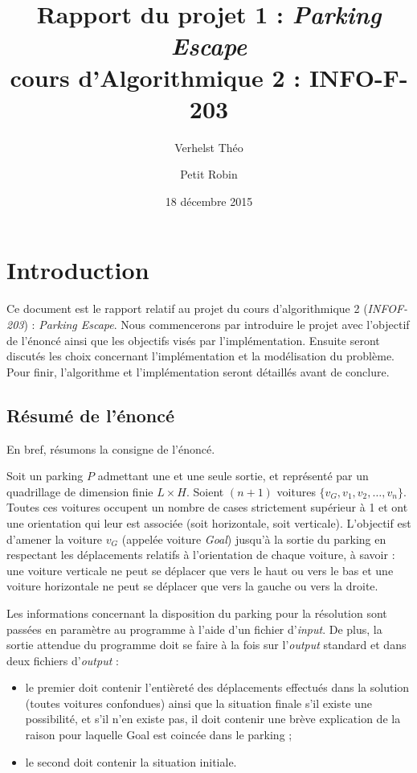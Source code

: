 \documentclass{article}
\title{Rapport du projet 1 : \textit{Parking Escape}\\cours d'Algorithmique 2 : INFO-F-203}
\author{Verhelst Théo \and Petit Robin}
\date{18 décembre 2015}
\begin{document}
\maketitle
\tableofcontents
\newpage
{}

\section{Introduction}
	Ce document est le rapport relatif au projet du cours d'algorithmique 2 (\textit{INFOF-203}) : \textit{Parking Escape}. Nous commencerons par
	introduire le projet avec l'objectif de l'énoncé ainsi que les objectifs visés par l'implémentation. Ensuite seront discutés les choix concernant
	l'implémentation et la modélisation du problème. Pour finir, l'algorithme et l'implémentation seront détaillés avant de conclure.

	\subsection{Résumé de l'énoncé}
		En bref, résumons la consigne de l'énoncé.

		Soit un parking $P$ admettant une et une seule sortie, et représenté par un quadrillage de dimension finie $L\times H$. Soient $(n+1)$ voitures
		$\{v_G, v_1, v_2, \ldots, v_n\}$. Toutes ces voitures occupent un nombre de cases strictement supérieur à 1 et ont une
		orientation qui leur est associée (soit horizontale, soit verticale). L'objectif est d'amener la voiture $v_G$ (appelée voiture \textit{Goal})
		jusqu'à la sortie du parking en respectant les déplacements relatifs à l'orientation de chaque voiture, à savoir : une voiture verticale ne peut
		se déplacer que vers le haut ou vers le bas et une voiture horizontale ne peut se déplacer que vers la gauche ou vers la droite.

		Les informations concernant la disposition du parking pour la résolution sont passées en paramètre au programme à l'aide d'un fichier d'\textit{input}.
		De plus, la sortie attendue du programme doit se faire à la fois sur l'\textit{output} standard et dans deux fichiers d'\textit{output} :

		\begin{itemize}
			\item le premier doit contenir l'entièreté des déplacements effectués dans la solution (toutes voitures confondues)
			      ainsi que la situation finale s'il existe une possibilité, et s'il n'en existe pas, il doit contenir une brève
			      explication de la raison pour laquelle Goal est coincée dans le parking ;
			\item le second doit contenir la situation initiale.
		\end{itemize}
\end{document}
